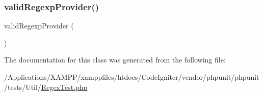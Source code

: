 \subsubsection{\texorpdfstring{valid\+Regexp\+Provider()}{validRegexpProvider()}}
{\footnotesize\ttfamily valid\+Regexp\+Provider (\begin{DoxyParamCaption}{ }\end{DoxyParamCaption})}



The documentation for this class was generated from the following file\+:\begin{DoxyCompactItemize}
\item 
/\+Applications/\+X\+A\+M\+P\+P/xamppfiles/htdocs/\+Code\+Igniter/vendor/phpunit/phpunit/tests/\+Util/\mbox{\hyperlink{_regex_test_8php}{Regex\+Test.\+php}}\end{DoxyCompactItemize}
